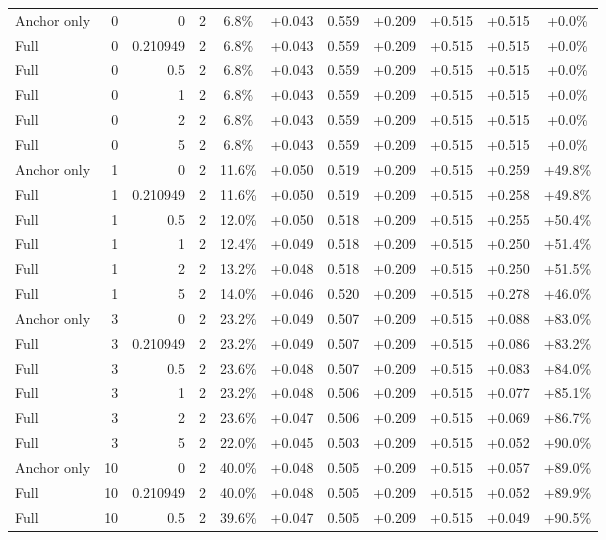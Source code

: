 \begin{table}[htbp]
\begin{tabular}{lrrrccccccc}
Anchor only & 0 & 0 & 2 & 6.8\% & +0.043 & 0.559 & +0.209 & +0.515 & +0.515 & +0.0\% \\
Full & 0 & 0.210949 & 2 & 6.8\% & +0.043 & 0.559 & +0.209 & +0.515 & +0.515 & +0.0\% \\
Full & 0 & 0.5 & 2 & 6.8\% & +0.043 & 0.559 & +0.209 & +0.515 & +0.515 & +0.0\% \\
Full & 0 & 1 & 2 & 6.8\% & +0.043 & 0.559 & +0.209 & +0.515 & +0.515 & +0.0\% \\
Full & 0 & 2 & 2 & 6.8\% & +0.043 & 0.559 & +0.209 & +0.515 & +0.515 & +0.0\% \\
Full & 0 & 5 & 2 & 6.8\% & +0.043 & 0.559 & +0.209 & +0.515 & +0.515 & +0.0\% \\
Anchor only & 1 & 0 & 2 & 11.6\% & +0.050 & 0.519 & +0.209 & +0.515 & +0.259 & +49.8\% \\
Full & 1 & 0.210949 & 2 & 11.6\% & +0.050 & 0.519 & +0.209 & +0.515 & +0.258 & +49.8\% \\
Full & 1 & 0.5 & 2 & 12.0\% & +0.050 & 0.518 & +0.209 & +0.515 & +0.255 & +50.4\% \\
Full & 1 & 1 & 2 & 12.4\% & +0.049 & 0.518 & +0.209 & +0.515 & +0.250 & +51.4\% \\
Full & 1 & 2 & 2 & 13.2\% & +0.048 & 0.518 & +0.209 & +0.515 & +0.250 & +51.5\% \\
Full & 1 & 5 & 2 & 14.0\% & +0.046 & 0.520 & +0.209 & +0.515 & +0.278 & +46.0\% \\
Anchor only & 3 & 0 & 2 & 23.2\% & +0.049 & 0.507 & +0.209 & +0.515 & +0.088 & +83.0\% \\
Full & 3 & 0.210949 & 2 & 23.2\% & +0.049 & 0.507 & +0.209 & +0.515 & +0.086 & +83.2\% \\
Full & 3 & 0.5 & 2 & 23.6\% & +0.048 & 0.507 & +0.209 & +0.515 & +0.083 & +84.0\% \\
Full & 3 & 1 & 2 & 23.2\% & +0.048 & 0.506 & +0.209 & +0.515 & +0.077 & +85.1\% \\
Full & 3 & 2 & 2 & 23.6\% & +0.047 & 0.506 & +0.209 & +0.515 & +0.069 & +86.7\% \\
Full & 3 & 5 & 2 & 22.0\% & +0.045 & 0.503 & +0.209 & +0.515 & +0.052 & +90.0\% \\
Anchor only & 10 & 0 & 2 & 40.0\% & +0.048 & 0.505 & +0.209 & +0.515 & +0.057 & +89.0\% \\
Full & 10 & 0.210949 & 2 & 40.0\% & +0.048 & 0.505 & +0.209 & +0.515 & +0.052 & +89.9\% \\
Full & 10 & 0.5 & 2 & 39.6\% & +0.047 & 0.505 & +0.209 & +0.515 & +0.049 & +90.5\% \\

\end{tabular}
\end{table}
